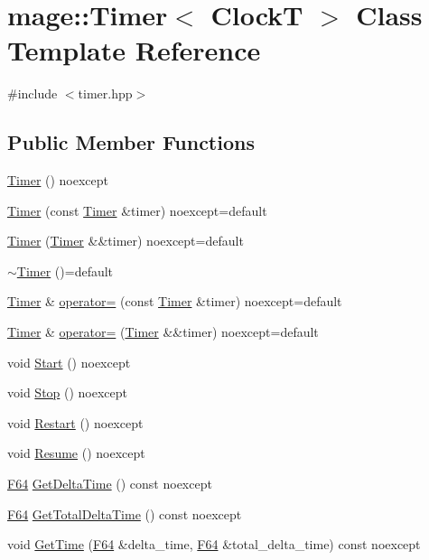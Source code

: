 \hypertarget{classmage_1_1_timer}{}\section{mage\+:\+:Timer$<$ ClockT $>$ Class Template Reference}
\label{classmage_1_1_timer}


{\ttfamily \#include $<$timer.\+hpp$>$}

\subsection*{Public Member Functions}
\begin{DoxyCompactItemize}
\item 
\hyperlink{classmage_1_1_timer_afdc4024388d57bbdda74854ee8a11683}{Timer} () noexcept
\item 
\hyperlink{classmage_1_1_timer_a69aa4becb39ab40f378bd110db8ceb84}{Timer} (const \hyperlink{classmage_1_1_timer}{Timer} \&timer) noexcept=default
\item 
\hyperlink{classmage_1_1_timer_a7fb565cbe34c04df2713c43d3341cbc4}{Timer} (\hyperlink{classmage_1_1_timer}{Timer} \&\&timer) noexcept=default
\item 
\hyperlink{classmage_1_1_timer_a2802ae35dfdc05ff57b49e82f9b504f2}{$\sim$\+Timer} ()=default
\item 
\hyperlink{classmage_1_1_timer}{Timer} \& \hyperlink{classmage_1_1_timer_a2a8aefb272e02d8ba4a26058df80f119}{operator=} (const \hyperlink{classmage_1_1_timer}{Timer} \&timer) noexcept=default
\item 
\hyperlink{classmage_1_1_timer}{Timer} \& \hyperlink{classmage_1_1_timer_a39654f81efccc38a4cbe6164659407dd}{operator=} (\hyperlink{classmage_1_1_timer}{Timer} \&\&timer) noexcept=default
\item 
void \hyperlink{classmage_1_1_timer_a633908e9e816e9397cd93b65bc11ddb3}{Start} () noexcept
\item 
void \hyperlink{classmage_1_1_timer_ab9442d64c2c1bedec830004f292725ab}{Stop} () noexcept
\item 
void \hyperlink{classmage_1_1_timer_a54dab2d77f8beca30d52e8497e466988}{Restart} () noexcept
\item 
void \hyperlink{classmage_1_1_timer_a8464b2ea3fb3d97eac5ccb3a5b02e47b}{Resume} () noexcept
\item 
\hyperlink{namespacemage_ad26233bbec640deda836e572c1a23708}{F64} \hyperlink{classmage_1_1_timer_ad4e320f1abe821aa1c9596c4d8b9c7e9}{Get\+Delta\+Time} () const noexcept
\item 
\hyperlink{namespacemage_ad26233bbec640deda836e572c1a23708}{F64} \hyperlink{classmage_1_1_timer_a4d67e33d559196d2d1ca1f75f12d5644}{Get\+Total\+Delta\+Time} () const noexcept
\item 
void \hyperlink{classmage_1_1_timer_a6ae023115c586f74e45bc9c9c4e7556b}{Get\+Time} (\hyperlink{namespacemage_ad26233bbec640deda836e572c1a23708}{F64} \&delta\+\_\+time, \hyperlink{namespacemage_ad26233bbec640deda836e572c1a23708}{F64} \&total\+\_\+delta\+\_\+time) const noexcept
\end{DoxyCompactItemize}

